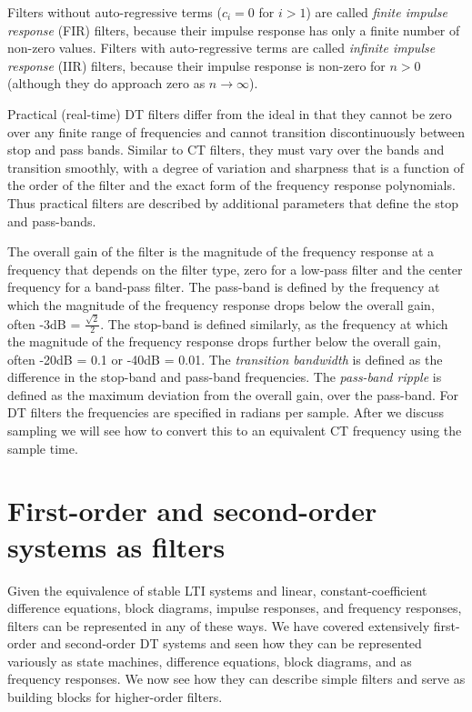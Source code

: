Filters without auto-regressive terms ($c_i = 0$ for $i > 1$) are called \emph{finite impulse response} (FIR) filters, because their impulse response has only a finite number of non-zero values. Filters with auto-regressive terms are called \emph{infinite impulse response} (IIR) filters, because their impulse response is non-zero for $n > 0$ (although they do approach zero as $n\rightarrow \infty$). 

Practical (real-time) DT filters differ from the ideal in that they cannot be zero over any finite range of frequencies and cannot transition discontinuously between stop and pass bands. Similar to CT filters, they must vary over the bands and transition smoothly, with a degree of variation and sharpness that is a function of the order of the filter and the exact form of the frequency response polynomials. Thus practical filters are described by additional parameters that define the stop and pass-bands.

The overall gain of the filter is the magnitude of the frequency response at a frequency that depends on the filter type, zero for a low-pass filter and the center frequency for a band-pass filter. The pass-band is defined by the frequency at which the magnitude of the frequency response drops below the overall gain, often -3dB = $\frac{\sqrt{2}}{2}$. The stop-band is defined similarly, as the frequency at which the magnitude of the frequency response drops further below the overall gain, often -20dB = 0.1 or -40dB = 0.01. The \emph{transition bandwidth} is defined as the difference in the stop-band and pass-band frequencies. The \emph{pass-band ripple} is defined as the maximum deviation from the overall gain, over the pass-band. For DT filters the frequencies are specified in radians per sample. After we discuss sampling we will see how to convert this to an equivalent CT frequency using the sample time.

\section{First-order and second-order systems as filters}

Given the equivalence of stable LTI systems and linear, constant-coefficient difference equations, block diagrams, impulse responses, and frequency responses, filters can be represented in any of these ways. We have covered extensively first-order and second-order DT systems and seen how they can be represented variously as state machines, difference equations, block diagrams, and as frequency responses. We now see how they can describe simple filters and serve as building blocks for higher-order filters.

